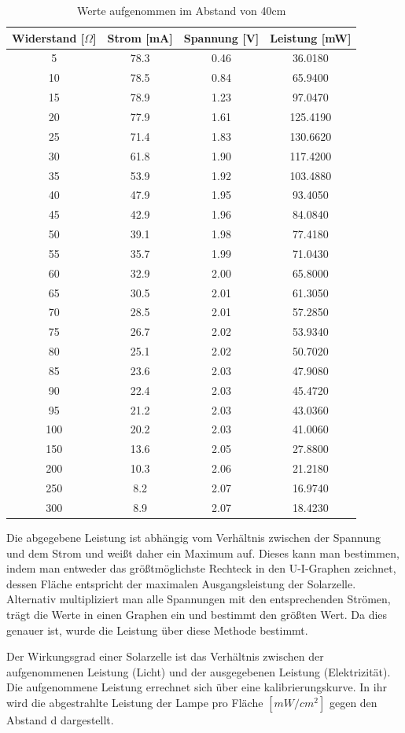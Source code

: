 \begin{table}[htbp]
\begin{tabular}{|c|c|c|c|}
\hline 
Widerstand [$\Omega$]	&Strom [mA]	&Spannung [V]	&Leistung [mW]\\	
\hline
5	&78.3	&0.46	&36.0180\\
10	&78.5	&0.84	&65.9400\\
15	&78.9	&1.23	&97.0470\\
20	&77.9	&1.61	&125.4190\\
25	&71.4	&1.83	&130.6620\\
30	&61.8	&1.90	&117.4200\\
35	&53.9	&1.92	&103.4880\\
40	&47.9	&1.95	&93.4050\\
45	&42.9	&1.96	&84.0840\\
50	&39.1	&1.98	&77.4180\\
55	&35.7	&1.99	&71.0430\\
60	&32.9	&2.00	&65.8000\\
65	&30.5	&2.01	&61.3050\\
70	&28.5	&2.01	&57.2850\\
75	&26.7	&2.02	&53.9340\\
80	&25.1	&2.02	&50.7020\\
85	&23.6	&2.03	&47.9080\\
90	&22.4	&2.03	&45.4720\\
95	&21.2	&2.03	&43.0360\\
100	&20.2	&2.03	&41.0060\\
150	&13.6	&2.05	&27.8800\\
200	&10.3	&2.06	&21.2180\\
250	&8.2	&2.07	&16.9740\\
300	&8.9	&2.07	&18.4230 \\
\hline 
\end{tabular}
\caption{Werte aufgenommen im Abstand von 40cm}
\end{table}

Die abgegebene Leistung ist abhängig vom Verhältnis zwischen der Spannung und dem Strom und weißt daher  ein Maximum auf. Dieses kann man bestimmen, indem man entweder das größtmöglichste Rechteck in den U-I-Graphen zeichnet, dessen Fläche entspricht der maximalen Ausgangsleistung der Solarzelle. Alternativ multipliziert man alle Spannungen mit den entsprechenden Strömen, trägt die Werte in einen Graphen ein und bestimmt den größten Wert. Da dies genauer ist, wurde die Leistung über diese Methode bestimmt.

Der Wirkungsgrad einer Solarzelle ist das Verhältnis zwischen der aufgenommenen Leistung (Licht) und der ausgegebenen Leistung (Elektrizität).
Die aufgenommene Leistung errechnet sich über eine kalibrierungskurve. In ihr wird die abgestrahlte Leistung der Lampe pro Fläche $[mW/cm^2]$ gegen den Abstand d dargestellt.

